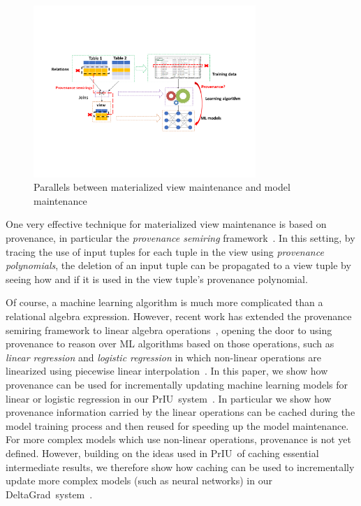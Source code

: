 \documentclass[11pt]{article}
\newcommand{\priu}{PrIU}
\newcommand{\deltagrad}{DeltaGrad}
\begin{document}
\begin{figure}
\begin{center}
\includegraphics[width=0.75\textwidth, bb = 100pt 0pt 600pt 250pt]{figs/Updating -rev.pdf}
\caption{Parallels between materialized view maintenance 
and model maintenance}
\label{fig:view-update}
\end{center}
\end{figure}

One very effective technique for materialized view maintenance is based on provenance, in particular the {\em provenance semiring} framework~\cite{GreenKT07}.  In this setting, by tracing the use of input tuples for each tuple in the view using {\em provenance polynomials}, the deletion of an input tuple can be propagated to a view tuple by seeing how and if it is used in the view tuple's provenance polynomial.

Of course, a machine learning algorithm is much more complicated than a relational algebra expression.  However, recent work has extended the provenance semiring framework to linear algebra operations~\cite{yan2016fine}, opening the door to using provenance to reason over ML algorithms based on those operations, such as {\em linear regression} and {\em logistic regression} in which non-linear operations are linearized using piecewise linear interpolation~\cite{wu2020priu}.  
In this paper, we show how provenance can be used for incrementally updating machine learning models for linear or logistic regression in our \priu\ system~\cite{wu2020priu}.  In particular we show how provenance information carried by the linear operations can be cached during the model training process and then reused for speeding up the model maintenance.
For more complex models which use non-linear operations, provenance is not yet defined. However, building on the ideas used in \priu\ of caching essential intermediate results, we therefore show how caching can be used to incrementally update more complex models (such as neural networks) in
our \deltagrad\ system~\cite{wu2020deltagrad}.
\end{document}
